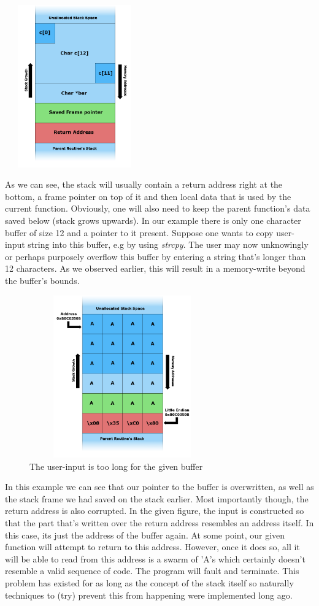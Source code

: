 \documentclass[10pt,twocolumn,a4paper]{article}
\begin{document}
\begin{center}
	\includegraphics[height=7cm,width=6cm]{fig/Stack_Overflow}
\end{center}
As we can see, the stack will usually contain a return address right at the bottom, a frame pointer on top of it and then local data that is used by the current function.
Obviously, one will also need to keep the parent function's data saved below (stack grows upwards).
In our example there is only one character buffer of size 12 and a pointer to it present.
\newpage
Suppose one wants to copy user-input string into this buffer, e.g by using \emph{strcpy}.
The user may now unknowingly or perhaps purposely overflow this buffer by entering a string that's longer than 12 characters.
As we observed earlier, this will result in a memory-write beyond the buffer's bounds. 
\begin{center}
	\begin{figure}[htbp]
		\includegraphics[height=7cm,width=8cm]{fig/Stack_Overflow2}
		\caption{The user-input is too long for the given buffer}
	\end{figure}
\end{center}
In this example we can see that our pointer to the buffer is overwritten, as well as the stack frame we had saved on the stack earlier.
Most importantly though, the return address is also corrupted.
In the given figure, the input is constructed so that the part that's written over the return address resembles an address itself.
In this case, its just the address of the buffer again.
At some point, our given function will attempt to return to this address.
However, once it does so, all it will be able to read from this address is a swarm of  'A's which certainly doesn't resemble a valid sequence of code.
The program will fault and terminate.
This problem has existed for as long as the concept of the stack itself so naturally techniques to (try) prevent this from happening were implemented long ago.
\end{document}
